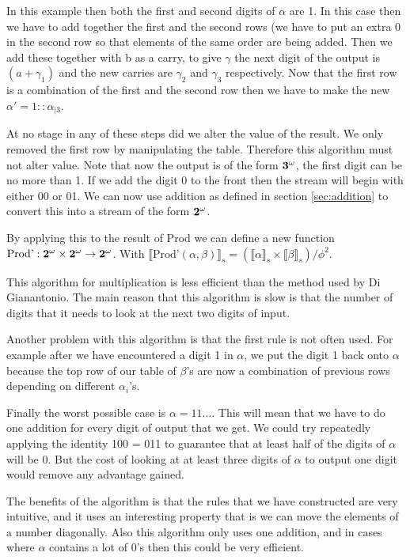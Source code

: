 \documentclass{cs4rep}
\begin{document}
In this example then both the first and second digits of $\alpha$ are
1. In this case then we have to add together the first and the second
rows (we have to put an extra 0 in the second row so that elements of
the same order are being added. Then we add these together with b as a
carry, to give $\gamma$ the next digit of the output is $(a +
\gamma_{1})$ and the new carries are $\gamma_{2}$ and $\gamma_{3}$
respectively. Now that the first row is a combination of the first and
the second row then we have to make the new $\alpha' = 1 ::
\alpha_{|3}$.

At no stage in any of these steps did we alter the value of the
result. We only removed the first row by manipulating the table.
Therefore this algorithm must not alter value. Note that now the
output is of the form ${\bf 3^{\omega}}$, the first digit can be
no more than 1. If we add the digit 0 to the front then the stream
will begin with either 00 or 01. We can now use addition as defined
in section \ref{sec:addition} to convert this into a stream of the form
${\bf 2^{\omega}}$.

By applying this to the result of Prod we can define a new
function $\mbox{Prod'}:{\bf 2^{\omega} \times 2^{\omega} \rightarrow
  2^{\omega}}$. With $ \llbracket \mbox{Prod'}(\alpha, \beta )
\rrbracket_{s} = (\llbracket \alpha \rrbracket_{s} \times \llbracket
\beta \rrbracket_{s}) / \phi^{2} $.

This algorithm for multiplication is less efficient than the method
used by Di Gianantonio. The main reason that this algorithm is slow
is that the number of digits that it needs to look at the next
two digits of input.

Another problem with this algorithm is that the first rule is
not often used. For example after we have encountered a digit
1 in $\alpha$, we put the digit 1 back onto $\alpha$ because
the top row of our table of $\beta$'s are now a combination of
previous rows depending on different $\alpha_{i}$'s.

Finally the worst possible case is $\alpha = 11\ldots$. This will mean
that we have to do one addition for every digit of output that we get.
We could try repeatedly applying the identity 100 = 011 to guarantee
that at least half of the digits of $\alpha$ will be 0. But the cost of
looking at at least three digits of $\alpha$ to output one digit would
remove any advantage gained.

The benefits of the algorithm is that the rules that we have
constructed are very intuitive, and it uses an interesting property
that is we can move the elements of a number diagonally. Also this
algorithm only uses one addition, and in cases where $\alpha$ contains
a lot of 0's then this could be very efficient.
\end{document}
